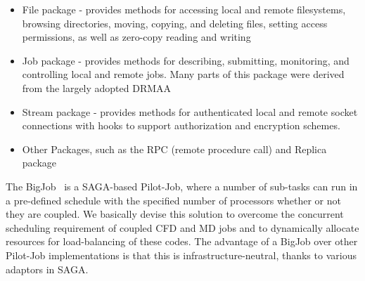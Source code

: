 \documentclass[preprint,12pt]{elsarticle}
\newcommand{\skonote}[1]{ {\textcolor{blue} { ***Jeff: #1 }}}
\newcommand{\skonote}[1]{}
\begin{document}
\begin{itemize}
\item File package - provides methods for accessing local and remote filesystems, browsing directories, moving, copying, and deleting files, setting access permissions, as well as zero-copy reading and writing
\item Job package - provides methods for describing, submitting, monitoring, and controlling local and remote jobs. Many parts of this package were derived from the largely adopted DRMAA %
\item Stream package - provides methods for authenticated local and remote socket connections with hooks to support authorization and encryption schemes.
\item Other Packages, such as the RPC (remote procedure call) and Replica package
\end{itemize}




The BigJob~\cite{saga_royalsoc} is a SAGA-based Pilot-Job, where a number of sub-tasks can run in a pre-defined schedule with the specified number of processors whether or not they are coupled. We basically devise this solution to overcome the concurrent scheduling requirement of coupled CFD and MD jobs and to dynamically allocate resources for load-balancing of these codes. The advantage of a BigJob over other Pilot-Job implementations is that this is infrastructure-neutral, thanks to various adaptors in SAGA.


\end{document}
